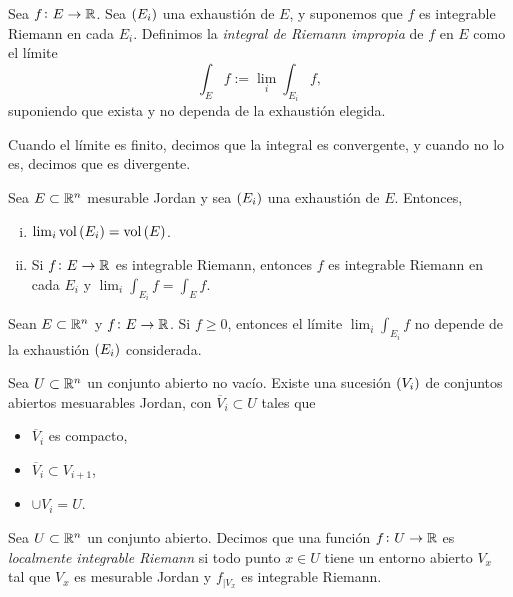 \begin{defi}
    Sea $f \colon E \to \mathbb{R}$. Sea $\left( E_i \right)$ una exhaustión de $E$, y suponemos que $f$ es integrable Riemann en cada $E_i$. Definimos la \textit{integral de Riemann impropia} de $f$ en $E$ como el límite
    \[
        \int_E f := \lim_i \int_{E_i} f,
    \]
    suponiendo que exista y no dependa de la exhaustión elegida.

    Cuando el límite es finito, decimos que la integral es convergente, y cuando no lo es, decimos que es divergente.
\end{defi}

\begin{prop}
    Sea $E \subset \mathbb{R}^n$ mesurable Jordan y sea $\left( E_i \right)$ una exhaustión de $E$. Entonces,
    \begin{enumerate}[(i)]
        \item $\lim_i \operatorname{vol} \left( E_i \right) = \operatorname{vol} \left( E \right)$.
        \item Si $f \colon E \to \mathbb{R} $ es integrable Riemann, entonces $f$ es integrable Riemann en cada $E_i$ y $\lim_i \int_{E_i} f = \int_E f$.
    \end{enumerate}
\end{prop}

\begin{prop}
    Sean $E \subset \mathbb{R}^n$ y $f \colon E \to \mathbb{R}$. Si $f\geq 0$, entonces el límite $\lim_i \int_{E_i} f$ no depende de la exhaustión $\left( E_i \right)$ considerada.
\end{prop}

\begin{lema}[(de la cebolla)]
    Sea $U \subset \mathbb{R}^n$ un conjunto abierto no vacío. Existe una sucesión $\left( V_i \right) $ de conjuntos abiertos mesuarables Jordan, con $\overline{V}_i \subset U$ tales que
    \begin{itemize}
        \item $\overline{V}_i$ es compacto,
        \item $\overline{V}_i \subset V_{i+1}$,
        \item $\cup V_i = U$.
    \end{itemize}
\end{lema}

\begin{defi}
    Sea $U \subset \mathbb{R}^n$ un conjunto abierto. Decimos que una función $f \colon U \to \mathbb{R}$ es \textit{localmente integrable Riemann} si todo punto $x \in U$ tiene un entorno abierto $V_x$ tal que $V_x$ es mesurable Jordan y $f_{|V_x}$ es integrable Riemann.
\end{defi}

